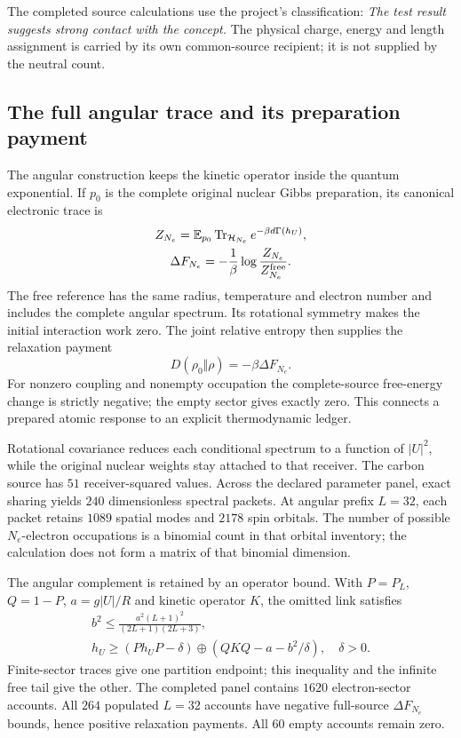 The completed source calculations use the project's classification: \emph{The test result suggests strong contact with the concept.} The physical charge, energy and length assignment is carried by its own common-source recipient; it is not supplied by the neutral count.

\subsection{The full angular trace and its preparation payment}

The angular construction keeps the kinetic operator inside the quantum exponential. If $p_0$ is the complete original nuclear Gibbs preparation, its canonical electronic trace is
\[
\begin{gathered}
Z_{N_e}=\mathbb E_{p_0}\operatorname{Tr}_{\mathcal H_{N_e}}
           e^{-\beta d\Gamma(h_U)},\\
 \Delta F_{N_e}=-\frac1\beta\log\frac{Z_{N_e}}{Z^{\rm free}_{N_e}}.
\end{gathered}
\]
The free reference has the same radius, temperature and electron number and includes the complete angular spectrum. Its rotational symmetry makes the initial interaction work zero. The joint relative entropy then supplies the relaxation payment
\[
 D(\rho_0\Vert\rho)=-\beta\Delta F_{N_e}.
\]
For nonzero coupling and nonempty occupation the complete-source free-energy change is strictly negative; the empty sector gives exactly zero. This connects a prepared atomic response to an explicit thermodynamic ledger. 

Rotational covariance reduces each conditional spectrum to a function of $|U|^2$, while the original nuclear weights stay attached to that receiver. The carbon source has $51$ receiver-squared values. Across the declared parameter panel, exact sharing yields $240$ dimensionless spectral packets. At angular prefix $L=32$, each packet retains $1089$ spatial modes and $2178$ spin orbitals. The number of possible $N_e$-electron occupations is a binomial count in that orbital inventory; the calculation does not form a matrix of that binomial dimension.

The angular complement is retained by an operator bound. With $P=P_L$, $Q=1-P$, $a=g|U|/R$ and kinetic operator $K$, the omitted link satisfies
\[
\begin{gathered}
b^2\leq\frac{a^2(L+1)^2}{(2L+1)(2L+3)},
 \\
 h_U\geq(P h_U P-\delta)\oplus
          (QKQ-a-b^2/\delta),\quad\delta>0.
\end{gathered}
\]
Finite-sector traces give one partition endpoint; this inequality and the infinite free tail give the other. The completed panel contains $1620$ electron-sector accounts. All $264$ populated $L=32$ accounts have negative full-source $\Delta F_{N_e}$ bounds, hence positive relaxation payments. All $60$ empty accounts remain zero.

